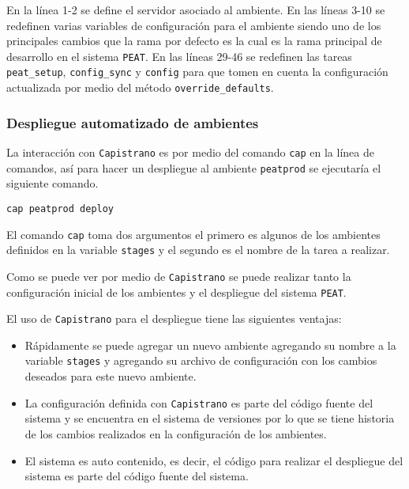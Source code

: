 En la línea 1-2 se define el servidor asociado al ambiente. En las líneas
3-10 se redefinen varias variables de configuración para el ambiente siendo uno
de los principales cambios que la rama por defecto es  la
cual es la rama principal de desarrollo en el sistema \texttt{PEAT}.
En las líneas 29-46 se redefinen las tareas \texttt{peat\_setup},
\texttt{config\_sync} y \texttt{config} para que tomen en cuenta la configuración
actualizada por medio del método \texttt{override\_defaults}.

\vspace{2.5mm}

\subsubsection{Despliegue automatizado de ambientes}

La interacción con \texttt{Capistrano} es por medio del comando \texttt{cap}
en la línea de comandos, así para hacer un despliegue al ambiente \texttt{peatprod}
se ejecutaría el siguiente comando.

\begin{verbatim}
cap peatprod deploy
\end{verbatim}

El comando \texttt{cap} toma dos argumentos el primero es algunos de los
ambientes definidos en la variable \texttt{stages} y el segundo es el nombre
de la tarea a realizar.

Como se puede ver por medio de \texttt{Capistrano} se puede realizar tanto
la configuración inicial de los ambientes y el despliegue del sistema \texttt{PEAT}.

El uso de \texttt{Capistrano} para el despliegue tiene las siguientes ventajas:
\begin{itemize}
\item Rápidamente se puede agregar un nuevo ambiente agregando su nombre a la
  variable \texttt{stages} y agregando su archivo de configuración con los
  cambios deseados para este nuevo ambiente.
\item La configuración definida con \texttt{Capistrano} es parte del código fuente
  del sistema y se encuentra en el sistema de versiones por lo que se tiene historia
  de los cambios realizados en la configuración de los ambientes.
\item El sistema es auto contenido, es decir, el código para realizar el despliegue
  del sistema es parte del código fuente del sistema.
\end{itemize}


